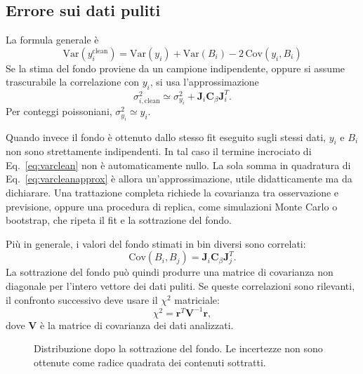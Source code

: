 \documentclass[11pt,a4paper]{book}
\begin{document}
\subsection{Errore sui dati puliti}
La formula generale è
\begin{equation}
 \boxed{
 \mathrm{Var}(y_i^{\mathrm{clean}})
 =\mathrm{Var}(y_i)+\mathrm{Var}(B_i)
 -2\,\mathrm{Cov}(y_i,B_i)
 }
 \label{eq:varclean}
\end{equation}
Se la stima del fondo proviene da un campione indipendente, oppure si assume trascurabile la correlazione con $y_i$, si usa l'approssimazione
\begin{equation}
 \boxed{
 \sigma_{i,\mathrm{clean}}^2
 \simeq \sigma_{y_i}^2+
 \mathbf J_i\mathbf C_{\beta}\mathbf J_i^T
 }.
 \label{eq:varcleanapprox}
\end{equation}
Per conteggi poissoniani, $\sigma_{y_i}^2\simeq y_i$.

Quando invece il fondo è ottenuto dallo stesso fit eseguito sugli stessi dati, $y_i$ e $B_i$ non sono strettamente indipendenti. In tal caso il termine incrociato di Eq.~\eqref{eq:varclean} non è automaticamente nullo. La sola somma in quadratura di Eq.~\eqref{eq:varcleanapprox} è allora un'approssimazione, utile didatticamente ma da dichiarare. Una trattazione completa richiede la covarianza tra osservazione e previsione, oppure una procedura di replica, come simulazioni Monte Carlo o bootstrap, che ripeta il fit e la sottrazione del fondo.

Più in generale, i valori del fondo stimati in bin diversi sono correlati:
\begin{equation}
 \mathrm{Cov}(B_i,B_j)=\mathbf J_i\mathbf C_{\beta}\mathbf J_j^T.
\end{equation}
La sottrazione del fondo può quindi produrre una matrice di covarianza non diagonale per l'intero vettore dei dati puliti. Se queste correlazioni sono rilevanti, il confronto successivo deve usare il $\chi^2$ matriciale:
\begin{equation}
 \chi^2=\mathbf r^T\mathbf V^{-1}\mathbf r,
\end{equation}
dove $\mathbf V$ è la matrice di covarianza dei dati analizzati.

\begin{figure}[htbp]
  \centering
  \caption{Distribuzione dopo la sottrazione del fondo. Le incertezze non sono ottenute come radice quadrata dei contenuti sottratti.}
  \label{fig:clean}
\end{figure}
\end{document}
